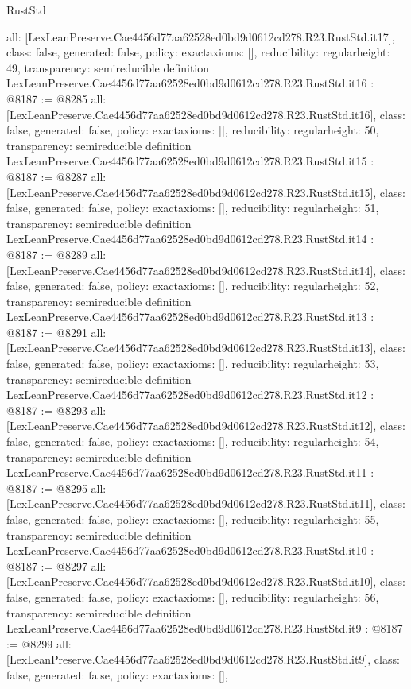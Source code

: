 \begin{lexlean}{RustStd}
\begin{coremodule}
{  all: [LexLeanPreserve.Cae4456d77aa62528ed0bd9d0612cd278.R23.RustStd.it17],
  class: false,
  generated: false,
  policy: exact{axioms: []},
  reducibility: regular{height: 49},
  transparency: semireducible
}
definition LexLeanPreserve.Cae4456d77aa62528ed0bd9d0612cd278.R23.RustStd.it16 : @8187 := @8285 {
  all: [LexLeanPreserve.Cae4456d77aa62528ed0bd9d0612cd278.R23.RustStd.it16],
  class: false,
  generated: false,
  policy: exact{axioms: []},
  reducibility: regular{height: 50},
  transparency: semireducible
}
definition LexLeanPreserve.Cae4456d77aa62528ed0bd9d0612cd278.R23.RustStd.it15 : @8187 := @8287 {
  all: [LexLeanPreserve.Cae4456d77aa62528ed0bd9d0612cd278.R23.RustStd.it15],
  class: false,
  generated: false,
  policy: exact{axioms: []},
  reducibility: regular{height: 51},
  transparency: semireducible
}
definition LexLeanPreserve.Cae4456d77aa62528ed0bd9d0612cd278.R23.RustStd.it14 : @8187 := @8289 {
  all: [LexLeanPreserve.Cae4456d77aa62528ed0bd9d0612cd278.R23.RustStd.it14],
  class: false,
  generated: false,
  policy: exact{axioms: []},
  reducibility: regular{height: 52},
  transparency: semireducible
}
definition LexLeanPreserve.Cae4456d77aa62528ed0bd9d0612cd278.R23.RustStd.it13 : @8187 := @8291 {
  all: [LexLeanPreserve.Cae4456d77aa62528ed0bd9d0612cd278.R23.RustStd.it13],
  class: false,
  generated: false,
  policy: exact{axioms: []},
  reducibility: regular{height: 53},
  transparency: semireducible
}
definition LexLeanPreserve.Cae4456d77aa62528ed0bd9d0612cd278.R23.RustStd.it12 : @8187 := @8293 {
  all: [LexLeanPreserve.Cae4456d77aa62528ed0bd9d0612cd278.R23.RustStd.it12],
  class: false,
  generated: false,
  policy: exact{axioms: []},
  reducibility: regular{height: 54},
  transparency: semireducible
}
definition LexLeanPreserve.Cae4456d77aa62528ed0bd9d0612cd278.R23.RustStd.it11 : @8187 := @8295 {
  all: [LexLeanPreserve.Cae4456d77aa62528ed0bd9d0612cd278.R23.RustStd.it11],
  class: false,
  generated: false,
  policy: exact{axioms: []},
  reducibility: regular{height: 55},
  transparency: semireducible
}
definition LexLeanPreserve.Cae4456d77aa62528ed0bd9d0612cd278.R23.RustStd.it10 : @8187 := @8297 {
  all: [LexLeanPreserve.Cae4456d77aa62528ed0bd9d0612cd278.R23.RustStd.it10],
  class: false,
  generated: false,
  policy: exact{axioms: []},
  reducibility: regular{height: 56},
  transparency: semireducible
}
definition LexLeanPreserve.Cae4456d77aa62528ed0bd9d0612cd278.R23.RustStd.it9 : @8187 := @8299 {
  all: [LexLeanPreserve.Cae4456d77aa62528ed0bd9d0612cd278.R23.RustStd.it9],
  class: false,
  generated: false,
  policy: exact{axioms: []},
}
\end{coremodule}
\end{lexlean}
